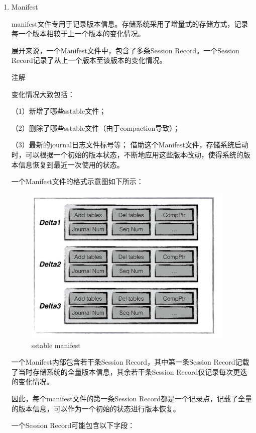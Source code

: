 		\begin{enumerate}
		
		\item Manifest

manifest文件专用于记录版本信息。存储系统采用了增量式的存储方式，记录每一个版本相较于上一个版本的变化情况。

展开来说，一个Manifest文件中，包含了多条Session Record。一个Session Record记录了从上一个版本至该版本的变化情况。

注解

变化情况大致包括：

（1）新增了哪些sstable文件；

（2）删除了哪些sstable文件（由于compaction导致）；

（3）最新的journal日志文件标号等；
借助这个Manifest文件，存储系统启动时，可以根据一个初始的版本状态，不断地应用这些版本改动，使得系统的版本信息恢复到最近一次使用的状态。

一个Manifest文件的格式示意图如下所示：
			
\begin{figure}[H]
	\centering
	\includegraphics[width=0.95\textwidth]{images/manifest.jpeg}
	\caption{sstable manifest}
	\label{sstable_manifest}
\end{figure}
			

一个Manifest内部包含若干条Session Record，其中第一条Session Record记载了当时存储系统的全量版本信息，其余若干条Session Record仅记录每次更迭的变化情况。

因此，每个manifest文件的第一条Session Record都是一个记录点，记载了全量的版本信息，可以作为一个初始的状态进行版本恢复。

一个Session Record可能包含以下字段：


\end{enumerate}
